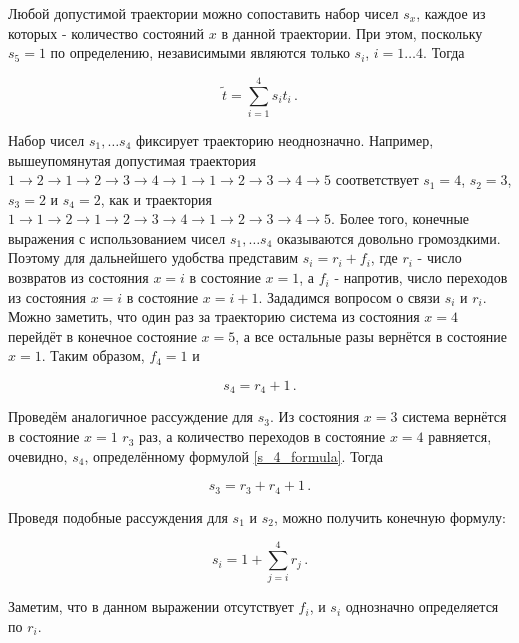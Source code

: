 \documentclass[12pt]{article}
\theoremstyle{definition}
\begin{document}
Любой допустимой траектории можно сопоставить набор чисел $s_x$, каждое из которых - количество состояний $x$ в данной траектории. При этом, поскольку $s_5=1$ по определению, независимыми являются только $s_i$, $i=1\ldots4$. Тогда

\begin{equation}
\label{eq1}
    \tilde{t} = \sum_{i=1}^4s_it_i\,.
\end{equation}

Набор чисел $s_1,\ldots s_4$ фиксирует траекторию неоднозначно. Например, вышеупомянутая допустимая траектория $1\rightarrow 2 \rightarrow 1 \rightarrow 2 \rightarrow 3 \rightarrow 4 \rightarrow 1 \rightarrow 1 \rightarrow 2 \rightarrow3 \rightarrow4\rightarrow5$ соответствует $s_1 = 4$, $s_2 = 3$, $s_3 = 2$ и $s_4=2$, как и траектория $1 \rightarrow 1 \rightarrow 2 \rightarrow 1 \rightarrow 2 \rightarrow 3 \rightarrow 4 \rightarrow 1 \rightarrow 2 \rightarrow3 \rightarrow4\rightarrow5$. Более того, конечные выражения с использованием чисел $s_1,\ldots s_4$ оказываются довольно громоздкими. Поэтому для дальнейшего удобства представим $s_i = r_i+f_i$, где $r_i$ - число возвратов из состояния $x=i$ в состояние $x=1$, а $f_i$ - напротив, число переходов из состояния $x=i$ в состояние $x=i+1$. Зададимся вопросом о связи $s_i$ и $r_i$. Можно заметить, что один раз за траекторию система из состояния $x=4$ перейдёт в конечное состояние $x=5$, а все остальные разы вернётся в состояние $x=1$. Таким образом, $f_4=1$ и

\begin{equation}
\label{s_4_formula}
    s_4 = r_4 + 1\,.
\end{equation}

Проведём аналогичное рассуждение для $s_3$. Из состояния $x=3$ система вернётся в состояние $x=1$ $r_3$ раз, а количество переходов в состояние $x=4$ равняется, очевидно, $s_4$, определённому формулой \eqref{s_4_formula}. Тогда

\begin{equation}
    s_3 = r_3 + r_4 + 1\,.
\end{equation}

Проведя подобные рассуждения для $s_1$ и $s_2$, можно получить конечную формулу:

\begin{equation}
\label{eq2}
    s_i = 1+\sum_{j=i}^4r_j\,.
\end{equation}

Заметим, что в данном выражении отсутствует $f_i$, и $s_i$ однозначно определяется по $r_i$.
\end{document}
